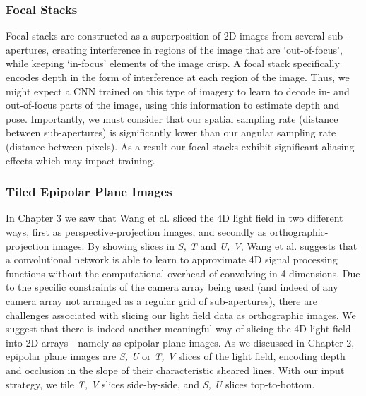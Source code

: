\subsubsection{Focal Stacks}
Focal stacks are constructed as a superposition of 2D images from several sub-apertures, creating interference in regions of the image that are `out-of-focus', while keeping `in-focus' elements of the image crisp. A focal stack specifically encodes depth in the form of interference at each region of the image. Thus, we might expect a CNN trained on this type of imagery to learn to decode in- and out-of-focus parts of the image, using this information to estimate depth and pose. Importantly, we must consider that our spatial sampling rate (distance between sub-apertures) is significantly lower than our angular sampling rate (distance between pixels). As a result our focal stacks exhibit significant aliasing effects which may impact training.

\subsubsection{Tiled Epipolar Plane Images}
In Chapter 3 we saw that Wang et al. \cite{wang2016lfcnn} sliced the 4D light field in two different ways, first as perspective-projection images, and secondly as orthographic-projection images. By showing slices in \textit{S, T} and \textit{U, V}, Wang et al. suggests that a convolutional network is able to learn to approximate 4D signal processing functions without the computational overhead of convolving in 4 dimensions. Due to the specific constraints of the camera array being used (and indeed of any camera array not arranged as a regular grid of sub-apertures), there are challenges associated with slicing our light field data as orthographic images. We suggest that there is indeed another meaningful way of slicing the 4D light field into 2D arrays - namely as epipolar plane images. As we discussed in Chapter 2, epipolar plane images are \textit{S, U} or \textit{T, V} slices of the light field, encoding depth and occlusion in the slope of their characteristic sheared lines. With our input strategy, we tile \textit{T, V} slices side-by-side, and \textit{S, U} slices top-to-bottom. 

